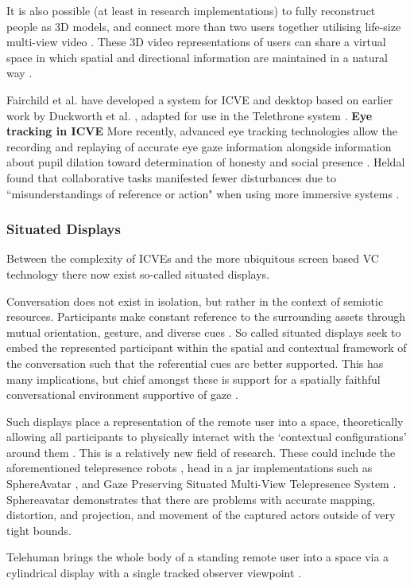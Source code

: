        It is also possible (at least in research implementations) to fully reconstruct people as 3D models, and connect more than two users together utilising life-size multi-view video \cite{Roberts2015, Grau2007, Divorra2010, Gross2003, Beck2013}. These 3D video representations of users can share a virtual space in which spatial and directional information are maintained in a natural way \cite{Roberts2015, Wolff2008}. \par
       Fairchild et al. have developed a system for ICVE and desktop based on earlier work by Duckworth et al. \cite{Duckworth:2012tx}, adapted for use in the Telethrone system \cite{Fairchild2016}.
            \textbf{Eye tracking in ICVE}
                More recently, advanced eye tracking technologies allow the recording and replaying of accurate eye gaze information\cite{Ciger2004a, Steptoe2009, Steptoe2008} alongside information about pupil dilation toward determination of honesty and social presence \cite{Steptoe2010a}.
            Heldal found that collaborative tasks manifested fewer disturbances due to ``misunderstandings of reference or action" when using more immersive systems \cite{Heldal2005}.
        \subsubsection{Situated Displays}
            Between the complexity of ICVEs and the more ubiquitous screen based VC technology there now exist so-called situated displays.\par
    Conversation does not exist in isolation, but rather in the context of semiotic resources. Participants make constant reference to the surrounding assets through mutual orientation, gesture, and diverse cues \cite{Goodwin2000a}.
            So called situated displays seek to embed the represented participant within the spatial and contextual framework of the conversation such that the referential cues are better supported. This has many implications, but chief amongst these is support for a spatially faithful conversational environment supportive of gaze \cite{Pan2014a, Oyekoya2012, Pan2012a, Zhang2013a}.\par
                    Such displays place a representation of the remote user into a space, theoretically allowing all participants to physically interact with the `contextual configurations' around them \cite{Goodwin2000a}. This is a relatively new field of research.  These could include the aforementioned telepresence robots \cite{Lee2011b, Sakamoto2007, Tsui2011}, head in a jar implementations such as SphereAvatar \cite{Oyekoya2012, pan2014comparing, Pan2012a},  and Gaze Preserving Situated Multi-View Telepresence System \cite{Pan2014a}.   Sphereavatar \cite{Oyekoya2012} demonstrates that there are problems with accurate mapping, distortion, and projection, and movement of the captured actors outside of very tight bounds.\par
                     Telehuman brings the whole body of a standing remote user into a space via a cylindrical display with a single tracked observer viewpoint \cite{Kim2012}.\par
